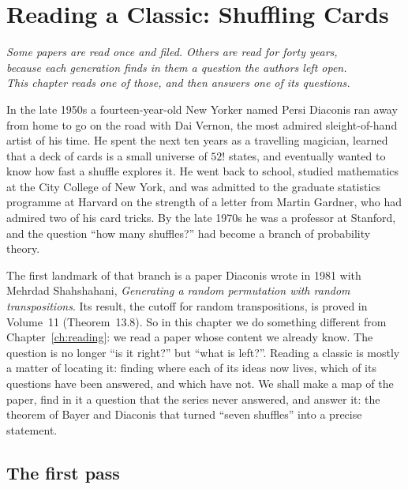 \chapter{Reading a Classic: Shuffling Cards}
\label{ch:shuffling}

\begin{center}\itshape
Some papers are read once and filed. Others are read for forty years,\\
because each generation finds in them a question the authors left open.\\
This chapter reads one of those, and then answers one of its questions.
\end{center}

In the late 1950s a fourteen-year-old New Yorker named Persi Diaconis ran away from home to go on the road with Dai Vernon, the most
admired sleight-of-hand artist of his time. He spent the next ten years as a travelling magician, learned that a deck of cards is a
small universe of $52!$ states, and eventually wanted to know how fast a shuffle explores it. He went back to school, studied
mathematics at the City College of New York, and was admitted to the graduate statistics programme at Harvard on the strength of a letter
from Martin Gardner, who had admired two of his card tricks. By the late 1970s he was a professor at Stanford, and the question ``how many
shuffles?'' had become a branch of probability theory.

The first landmark of that branch is a paper Diaconis wrote in 1981 with Mehrdad Shahshahani, \emph{Generating a random permutation with random
transpositions}. Its result, the cutoff for random transpositions, is proved in Volume~11 (Theorem~13.8). So in this chapter we do something
different from Chapter~\ref{ch:reading}: we read a paper whose content we already know. The question is no longer ``is it right?'' but ``what is
left?''. Reading a classic is mostly a matter of locating it: finding where each of its ideas now lives, which of its questions have been
answered, and which have not. We shall make a map of the paper, find in it a question that the series never answered, and answer it: the
theorem of Bayer and Diaconis that turned ``seven shuffles'' into a precise statement.

\section{The first pass}

